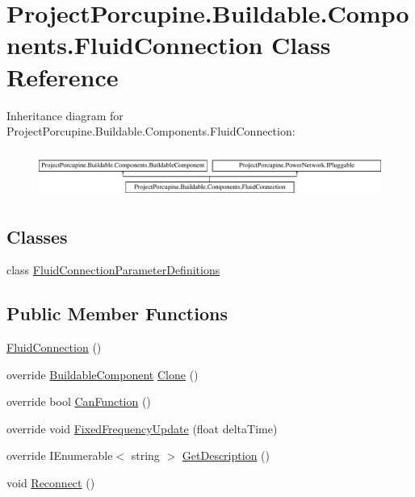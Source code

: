 \hypertarget{class_project_porcupine_1_1_buildable_1_1_components_1_1_fluid_connection}{}\section{Project\+Porcupine.\+Buildable.\+Components.\+Fluid\+Connection Class Reference}
\label{class_project_porcupine_1_1_buildable_1_1_components_1_1_fluid_connection}
Inheritance diagram for Project\+Porcupine.\+Buildable.\+Components.\+Fluid\+Connection\+:\begin{figure}[H]
\begin{center}
\leavevmode
\includegraphics[height=1.530055cm]{class_project_porcupine_1_1_buildable_1_1_components_1_1_fluid_connection}
\end{center}
\end{figure}
\subsection*{Classes}
\begin{DoxyCompactItemize}
\item 
class \hyperlink{class_project_porcupine_1_1_buildable_1_1_components_1_1_fluid_connection_1_1_fluid_connection_parameter_definitions}{Fluid\+Connection\+Parameter\+Definitions}
\end{DoxyCompactItemize}
\subsection*{Public Member Functions}
\begin{DoxyCompactItemize}
\item 
\hyperlink{class_project_porcupine_1_1_buildable_1_1_components_1_1_fluid_connection_a19af6564104e3740dde0367413b0e3a1}{Fluid\+Connection} ()
\item 
override \hyperlink{class_project_porcupine_1_1_buildable_1_1_components_1_1_buildable_component}{Buildable\+Component} \hyperlink{class_project_porcupine_1_1_buildable_1_1_components_1_1_fluid_connection_aa280aa9d7723a5dad3ceecdba405c4ba}{Clone} ()
\item 
override bool \hyperlink{class_project_porcupine_1_1_buildable_1_1_components_1_1_fluid_connection_a8f3e90619dd04d8adc149e2d24ebf31a}{Can\+Function} ()
\item 
override void \hyperlink{class_project_porcupine_1_1_buildable_1_1_components_1_1_fluid_connection_aa61596b6b7cb20b8ef6c0672fa3f3119}{Fixed\+Frequency\+Update} (float delta\+Time)
\item 
override I\+Enumerable$<$ string $>$ \hyperlink{class_project_porcupine_1_1_buildable_1_1_components_1_1_fluid_connection_a61c5dde2b1470fc3127136891d4e9888}{Get\+Description} ()
\item 
void \hyperlink{class_project_porcupine_1_1_buildable_1_1_components_1_1_fluid_connection_a0c7aa227db4d28fd8552631ed4cf89c5}{Reconnect} ()
\end{DoxyCompactItemize}
